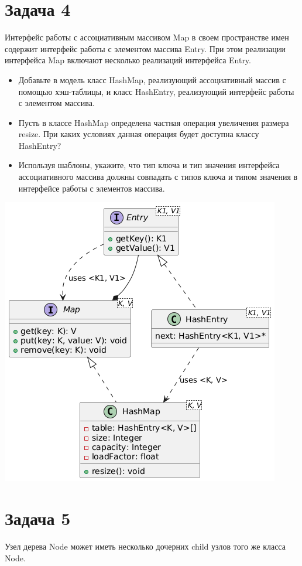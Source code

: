 \documentclass{article}
\begin{document}
\section{Задача 4}
Интерфейс работы с ассоциативным массивом Map в своем пространстве имен содержит интерфейс работы с элементом массива Entry. При этом реализации интерфейса Map включают несколько реализаций интерфейса Entry.




\begin{itemize}
    \item Добавьте в модель класс HashMap, реализующий ассоциативный массив с помощью хэш-таблицы, и класс HashEntry, реализующий интерфейс работы с элементом массива.
    \item Пусть в классе HashMap определена частная операция увеличения размера resize. При каких условиях данная операция будет доступна классу HashEntry?
    \item Используя шаблоны, укажите, что тип ключа и тип значения интерфейса ассоциативного массива должны совпадать с типов ключа и типом значения в интерфейсе работы с элементов массива.
\end{itemize}

\includegraphics[width=\textwidth]{4.png}

\section{Задача 5}
Узел дерева Node может иметь несколько дочерних child узлов того же класса Node.
\end{document}
